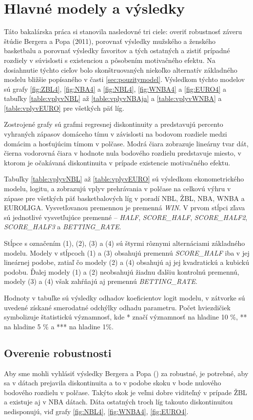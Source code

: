 \documentclass[
  digital, %
  oneside, %
  notable,   %
  lof,     %
  lot,     %
]{fithesis3}
\begin{document}
	\chapter{Hlavné modely a výsledky}
	Táto bakalárska práca si stanovila nasledovné tri ciele: overiť robustnosť záveru štúdie Bergera a Popa (2011), porovnať výsledky mužského a ženského basketbalu a porovnať výsledky favoritov a tých ostatných a zistiť prípadné rozdiely v súvislosti s existenciou a pôsobením motivačného efektu. Na dosiahnutie týchto cieľov bolo skonštruovaných niekoľko alternatív základného modelu bližšie popísaného v časti \ref{sec:pouzitymodel}. Výsledkom týchto modelov sú grafy \ref{fig:ZBL4}, \ref{fig:NBA4} a \ref{fig:NBL4}, \ref{fig:WNBA4} a \ref{fig:EURO4} a tabuľky \ref{table:vplyvNBL} až \ref{table:vplyvNBAja} a \ref{table:vplyvWNBA} a \ref{table:vplyvEURO} pre všetkých päť líg.
	
	Zostrojené grafy sú grafmi regresnej diskontinuity a predstavujú percento vyhraných zápasov domáceho tímu v závislosti na bodovom rozdiele medzi domácim a hosťujúcim tímom v polčase. Modrá čiara zobrazuje lineárny tvar dát, čierna vodorovná čiara v hodnote nula bodového rozdielu predstavuje miesto, v ktorom je očakávaná diskontinuita v prípade existencie motivačného efektu.

	Tabuľky \ref{table:vplyvNBL} až \ref{table:vplyvEURO} sú výsledkom ekonometrického modelu, logitu, a zobrazujú vplyv prehrávania v polčase na celkovú výhru v zápase pre všetkých päť basketbalových líg v poradí NBL, ŽBL, NBA, WNBA a EUROLIGA. Vysvetľovanou premennou je premenná \textit{WIN}. V prvom stĺpci zľava sú jednotlivé vysvetľujúce premenné – \textit{HALF}, \textit{SCORE\_HALF}, \textit{SCORE\_HALF2}, \textit{SCORE\_HALF3} a \textit{BETTING\_RATE}. 

	Stĺpce s označením (1), (2), (3) a (4) sú štyrmi rôznymi alternáciami základného modelu. Modely v stĺpcoch (1) a (3) obsahujú premennú \textit{SCORE\_HALF} iba v jej lineárnej podobe, zatiaľ čo modely (2) a (4) obsahujú aj jej kvadratickú a kubickú podobu. Ďalej modely (1) a (2) neobsahujú žiadnu ďalšiu kontrolnú premennú, modely (3) a (4) však zahŕňajú aj premennú \textit{BETTING\_RATE}. 
	
	Hodnoty v tabuľke sú výsledky odhadov koeficientov logit modelu, v zátvorke sú uvedené získané smerodatné odchýlky odhadu parametru. Počet hviezdičiek symbolizuje štatistickú významnosť, kde * značí významnosť na hladine 10 \%, ** na hladine 5 \% a *** na hladine 1\%.

	\section{Overenie robustnosti}
	\label{sec:overenie}
	Aby sme mohli vyhlásiť výsledky Bergera a Popa (\citeyear{berger2011}) za robustné, je potrebné, aby sa v dátach prejavila diskontinuita a to v podobe skoku v bode nulového bodového rozdielu v polčase. Takýto skok je veľmi dobre viditeľný v prípade ŽBL a existuje aj v NBA dátach. Dáta ostatných troch líg takouto diskontinuitou nedisponujú, viď grafy \ref{fig:NBL4}, \ref{fig:WNBA4}, \ref{fig:EURO4}. 
	
\end{document}
